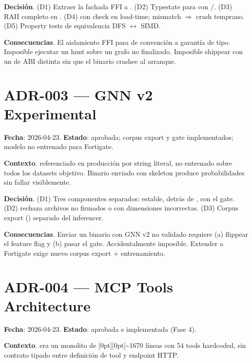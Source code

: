 \textbf{Decisión}. (D1) Extraer la fachada FFI a
. (D2) Typestate para 
con /. (D3) RAII completo en
. (D4)  con check en
load-time; mismatch $\Rightarrow$ crash temprano. (D5) Property
tests de equivalencia DFS $\leftrightarrow$ SIMD.

\textbf{Consecuencias}. El aislamiento FFI pasa de convención a
garantía de tipo. Imposible ejecutar un hunt sobre un grafo no
finalizado. Imposible shippear con un 
de ABI distinta sin que el binario crashee al arranque.

\section*{ADR-003 — GNN v2 Experimental}

\textbf{Fecha}: 2026-04-23. \textbf{Estado}: aprobada; corpus
export y gate implementados; modelo no entrenado para Fortigate.

\textbf{Contexto}.  referenciado en
producción por string literal, no entrenado sobre todos los
datasets objetivo. Binario enviado con skeleton produce
probabilidades sin fallar visiblemente.

\textbf{Decisión}. (D1) Tres componentes separados:
 estable,  detrás de
, 
con el gate. (D2)  rechaza archivos no
firmados o con dimensiones incorrectas. (D3) Corpus export
() separado del
inferencer.

\textbf{Consecuencias}. Enviar un binario con GNN v2 no validado
requiere (a) flippear el feature flag y (b) pasar el gate.
Accidentalmente imposible. Extender a Fortigate exige nuevo corpus
export + entrenamiento.

\section*{ADR-004 — MCP Tools Architecture}

\textbf{Fecha}: 2026-04-23. \textbf{Estado}: aprobada e
implementada (Fase 4).

\textbf{Contexto}.  era un
monolito de \raisebox{0pt}[0pt][0pt]{\textasciitilde}1670 líneas con 54 tools hardcoded, sin
contrato tipado entre definición de tool y endpoint HTTP.

